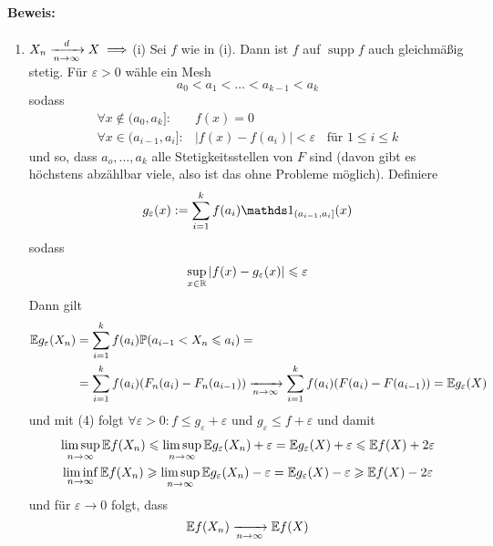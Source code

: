 \paragraph{Beweis:}
\begin{enumerate}[label=\Roman*. ]
    \item $X_n\nto{d}{n\to\infty}X\implies$(i) \newline
    Sei $f$ wie in (i). Dann ist $f$ auf $\operatorname{supp}f$ auch gleichm\"a\ss{}ig stetig. F\"ur $\varepsilon>0$ w\"ahle ein Mesh    
        $$a_0<a_1<\hdots<a_{k-1}<a_k$$
		sodass 
    \begin{align*}
        \forall x\notin(a_0,a_k]:&f(x)=0 \\
        \forall x\in(a_{i-1},a_i]:&|f(x)-f(a_i)|<\varepsilon \ \ \ \ \text{f\"ur } 1\leq i\leq k 
	\end{align*}
    und so, dass $a_o,\hdots,a_k$ alle Stetigkeitsstellen von $F$ sind (davon
    gibt es h\"ochstens abz\"ahlbar viele, also ist das ohne Probleme m\"oglich).\newline
	Definiere
        $$g_\varepsilon(x):=\sum_{i=1}^kf(a_i)\ind{(a_{i-1},a_i]}(x)$$
	sodass 
    \begin{gather}
        \sup_{x\in\mathbb{R}}|f(x)-g_\varepsilon(x)|\leqslant\varepsilon
	\end{gather}
	Dann gilt 
    \begin{align*}
	   \E g_\varepsilon(X_n)&=\sum_{i=1}^kf(a_i)\Pp(a_{i-1}<X_n\leq a_i)= \\
        &=\sum_{i=1}^kf(a_i)(F_n(a_i)-F_n(a_{i-1}))\nto{}{n\to\infty}\sum_{i=1}^kf(a_i)(F(a_i)-F(a_{i-1}))=\E g_\varepsilon(X)
    \end{align*}
    und mit (4) folgt $\forall\varepsilon>0: f\leq g_\varepsilon+\varepsilon$ und $g_\varepsilon\leq f+\varepsilon$ und damit
	\begin{gather*}
        \limsup_{n\to\infty}\mathbb{E} f(X_n)\leqslant\limsup_{n\to\infty}\mathbb{E} g_\varepsilon(X_n)+\varepsilon=\mathbb{E} g_\varepsilon(X)+\varepsilon\leqslant\mathbb{E} f(X)+2\varepsilon \\
		\liminf_{n\to\infty}\mathbb{E} f(X_n)\geqslant\limsup_{n\to\infty}\mathbb{E} g_\varepsilon(X_n)-\varepsilon=\mathbb{E} g_\varepsilon(X)-\varepsilon\geqslant\mathbb{E} f(X)-2\varepsilon
    \end{gather*}
    und f\"ur $\varepsilon\to0$ folgt, dass 
        $$\E f(X_n)\nto{}{n\to\infty}\E f(X)$$
    

\end{enumerate}
